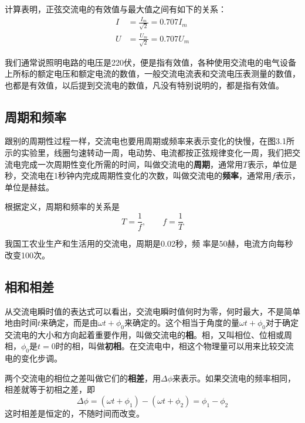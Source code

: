 计算表明，正弦交流电的有效值与最大值之间有如下的关系：
\[\begin{split}
   I&=\frac{I_m}{\sqrt{2}}=0.707I_m\\
   U&=\frac{U_m}{\sqrt{2}}=0.707U_m 
\end{split}\]

我们通常说照明电路的电压是220伏，便是指有效值，各种使用交流电的电气设备上所标的额定电压和额定电流的数值，一般交流电流表和交流电压表测量的数值，也都是有效值，以后提到交流电的数值，凡没有特别说明的，都是指有效值。

\subsection{周期和频率}

跟别的周期性过程一样，交流电也要用周期或频率来表示变化的快慢，在图3.1所示的实验里，线圈匀速转动一周，电动势、电流都按正弦规律变化一周，我们把交流电完成一次周期性变化所需的时间，叫做交流电的\textbf{周期}，通常用$T$表示，单位是秒，交流电在1秒钟内完成周期性变化的次数，叫做交流电的\textbf{频率}，通常用$f$表示，单位是赫兹。

根据定义，周期和频率的关系是
\[T=\frac{1}{f},\qquad f=\frac{1}{T}\]
	
我国工农业生产和生活用的交流电，周期是0.02秒，频
率是50赫，电流方向每秒改变100次。

\subsection{相和相差}

从交流电瞬时值的表达式可以看出，交流电瞬时值何时为零，何时最大，不是简单地由时间$t$来确定，而是由$\omega t+\phi_0$来确定的。这个相当于角度的量$\omega t+\phi_0$对于确定交流电的大小和方向起着重要作用，叫做交流电的\textbf{相}。相，又叫相位、位相或周相，$\phi_0$是$t=0$时的相，叫做\textbf{初相}。在交流电中，相这个物理量可以用来比较交流电的变化步调。

两个交流电的相位之差叫做它们的\textbf{相差}，用$\Delta \phi$来表示。如果交流电的频率相同，相差就等于初相之差，即
\[\Delta \phi=(\omega t+\phi_1)-(\omega t+\phi_2)=\phi_1-\phi_2 \]
这时相差是恒定的，不随时间而改变。


